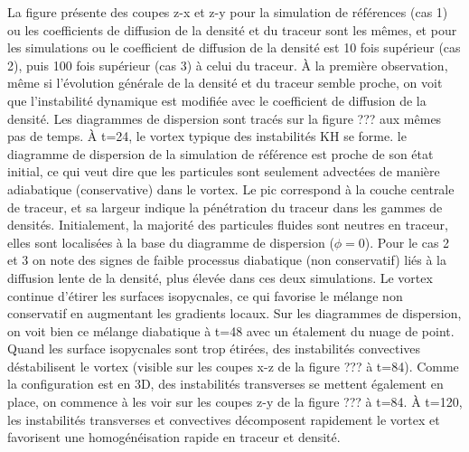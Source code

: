 \documentclass[a4paper,12pt]{article}
\begin{document}
    La figure  présente des coupes z-x et z-y pour la simulation de références (cas 1) ou les coefficients de diffusion de la densité et du traceur sont les mêmes, et pour les simulations ou le coefficient de diffusion de la densité est 10 fois supérieur (cas 2), puis 100 fois supérieur (cas 3) à celui du traceur. À la première observation, même si l'évolution générale de la densité et du traceur semble proche, on voit que l'instabilité dynamique est modifiée avec le coefficient de diffusion de la densité. Les diagrammes de dispersion sont tracés sur la figure ??? aux mêmes pas de temps. 
    À t=24, le vortex typique des instabilités KH se forme. le diagramme de dispersion de la simulation de référence est proche de son état initial, ce qui veut dire que les particules sont seulement advectées de manière adiabatique (conservative) dans le vortex. Le pic correspond à la couche centrale de traceur, et sa largeur indique la pénétration du traceur dans les gammes de densités. Initialement, la majorité des particules fluides sont neutres en traceur, elles sont localisées à la base du diagramme de dispersion ($\phi=0$). Pour le cas 2 et 3 on note des signes de faible processus diabatique (non conservatif) liés à la diffusion lente de la densité, plus élevée dans ces deux simulations. 
    Le vortex continue d'étirer les surfaces isopycnales, ce qui favorise le mélange non conservatif en augmentant les gradients locaux. Sur les diagrammes de dispersion, on voit bien ce mélange diabatique à t=48 avec un étalement du nuage de point. 
    Quand les surface isopycnales sont trop étirées, des instabilités convectives déstabilisent le vortex (visible sur les coupes x-z de la figure ??? à t=84). Comme la configuration est en 3D, des instabilités transverses se mettent également en place, on commence à les voir sur les coupes z-y de la figure ??? à t=84. 
    À t=120, les instabilités transverses et convectives décomposent rapidement le vortex et favorisent une homogénéisation rapide en traceur et densité. 
\end{document}
